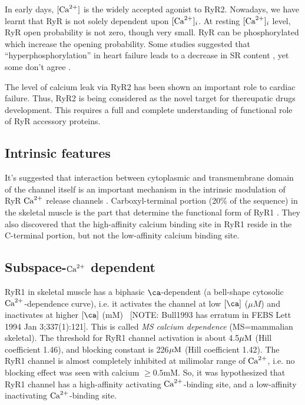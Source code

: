 In early days, $[{\text{Ca}^{2+}}]$ is the widely accepted agonist to RyR2. Nowadays, we have
learnt that RyR is not solely dependent upon $[{\text{Ca}^{2+}}]_i$. At resting $[{\text{Ca}^{2+}}]_i$
level, RyR open probability is not zero, though very small. RyR can be
phosphorylated \citep{valdivia1995, marx2000} which increase the opening
probability. Some studies suggested that ``hyperphosphorylation'' in heart
failure leads to a decrease in SR content \citep{marks2001}, yet some don't
agree \citep{bers2003}.

The level of calcium leak via RyR2 has been shown an important role to cardiac
failure. Thus, RyR2 is being considered as the novel target for thereupatic
drugs development. This requires a full and complete understanding of functional
role of RyR accessory proteins.

\subsection{Intrinsic features}

It's suggested that interaction between cytoplasmic and transmembrane domain of
the channel itself is an important mechanism in the intrinsic modulation of RyR
${\text{Ca}^{2+}}$ release channels \citep{george2004}. Carboxyl-terminal portion (20\% of
the sequence) in the skeletal muscle is the part that determine the functional
form of RyR1 \citep{Bhat1997}. They also discovered that the high-affinity
calcium binding site in RyR1 reside in the C-terminal portion, but not the
low-affinity calcium binding site.
 
\subsection{Subspace-${\text{Ca}^{2+}}$ dependent}
\label{sec:RyR_subspace_Calcium}

RyR1 in skeletal muscle has a biphasic $\ca$-dependent (a bell-shape cytosolic
${\text{Ca}^{2+}}$-dependence curve), i.e. it activates the channel at low $[\ca]$ ($\mu M$)
and inactivates at higher $[\ca]$ (mM)~\citep{Bull1993,Percival1994} [NOTE:
Bull1993 has erratum in FEBS Lett 1994 Jan 3;337(1):121]. This is called {\it MS
calcium dependence} (MS=mammalian skeletal). The threshold for RyR1 channel
activation is about 4.5${\mu\text{M}}$ (Hill coefficient 1.46), and blocking constant is
226${\mu\text{M}}$ (Hill coefficient 1.42). The RyR1 channel is almost completely
inhibited at milimolar range of ${\text{Ca}^{2+}}$, i.e. no blocking effect was seen with
calcium $\ge 0.5$mM. So, it was hypothesized that RyR1 channel has a
high-affinity activating ${\text{Ca}^{2+}}$-binding site, and a low-affinity inactivating
${\text{Ca}^{2+}}$-binding site.


